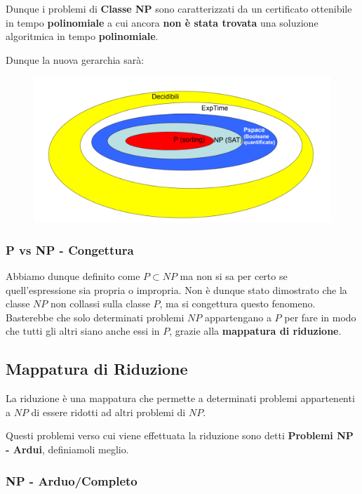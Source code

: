 \documentclass{article}
\begin{document}
Dunque i problemi di \textbf{Classe NP} sono caratterizzati da un certificato ottenibile in tempo \textbf{polinomiale} a cui ancora \textbf{non è stata trovata} una soluzione algoritmica in tempo \textbf{polinomiale}.

Dunque la nuova gerarchia sarà:

\begin{figure}[htbp]
    \center
    \includegraphics[scale=0.4]{img/classiComplessita2.png}
\end{figure}

\newpage

\subsubsection{P vs NP - Congettura} Abbiamo dunque definito come $P \subset NP$ ma non si sa per certo se quell'espressione sia propria o impropria. Non è dunque stato dimostrato che la classe $NP$ non collassi sulla classe $P$, ma si congettura questo fenomeno. Basterebbe che solo determinati problemi $NP$ appartengano a $P$ per fare in modo che tutti gli altri siano anche essi in $P$, grazie alla \textbf{mappatura di riduzione}.

\vskip 1.5cm


\subsection{Mappatura di Riduzione}

La riduzione è una mappatura che permette a determinati problemi appartenenti a $NP$ di essere ridotti ad altri problemi di $NP$.

Questi problemi verso cui viene effettuata la riduzione sono detti \textbf{Problemi NP - Ardui}, definiamoli meglio.

\subsubsection{NP - Arduo/Completo} 
\end{document}
